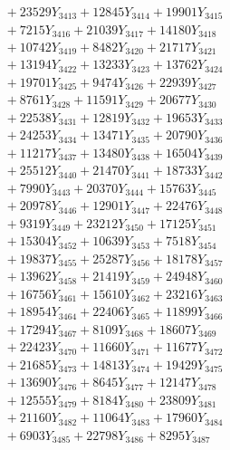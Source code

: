 \documentclass[a4paper,10pt]{article}
\begin{document}
{\begin{align}
&\;  + 23529 Y_{3413} + 12845 Y_{3414} + 19901 Y_{3415} \\[0.3ex]
&\;  + 7215 Y_{3416} + 21039 Y_{3417} + 14180 Y_{3418} \\[0.5ex]\allowbreak
&\;  + 10742 Y_{3419} + 8482 Y_{3420} + 21717 Y_{3421} \\[0.3ex]
&\;  + 13194 Y_{3422} + 13233 Y_{3423} + 13762 Y_{3424} \\[0.3ex]
&\;  + 19701 Y_{3425} + 9474 Y_{3426} + 22939 Y_{3427} \\[0.3ex]
&\;  + 8761 Y_{3428} + 11591 Y_{3429} + 20677 Y_{3430} \\[0.3ex]
&\;  + 22538 Y_{3431} + 12819 Y_{3432} + 19653 Y_{3433} \\[0.3ex]
&\;  + 24253 Y_{3434} + 13471 Y_{3435} + 20790 Y_{3436} \\[0.3ex]
&\;  + 11217 Y_{3437} + 13480 Y_{3438} + 16504 Y_{3439} \\[0.3ex]
&\;  + 25512 Y_{3440} + 21470 Y_{3441} + 18733 Y_{3442} \\[0.3ex]
&\;  + 7990 Y_{3443} + 20370 Y_{3444} + 15763 Y_{3445} \\[0.3ex]
&\;  + 20978 Y_{3446} + 12901 Y_{3447} + 22476 Y_{3448} \\[0.5ex]\allowbreak
&\;  + 9319 Y_{3449} + 23212 Y_{3450} + 17125 Y_{3451} \\[0.3ex]
&\;  + 15304 Y_{3452} + 10639 Y_{3453} + 7518 Y_{3454} \\[0.3ex]
&\;  + 19837 Y_{3455} + 25287 Y_{3456} + 18178 Y_{3457} \\[0.3ex]
&\;  + 13962 Y_{3458} + 21419 Y_{3459} + 24948 Y_{3460} \\[0.3ex]
&\;  + 16756 Y_{3461} + 15610 Y_{3462} + 23216 Y_{3463} \\[0.3ex]
&\;  + 18954 Y_{3464} + 22406 Y_{3465} + 11899 Y_{3466} \\[0.3ex]
&\;  + 17294 Y_{3467} + 8109 Y_{3468} + 18607 Y_{3469} \\[0.3ex]
&\;  + 22423 Y_{3470} + 11660 Y_{3471} + 11677 Y_{3472} \\[0.3ex]
&\;  + 21685 Y_{3473} + 14813 Y_{3474} + 19429 Y_{3475} \\[0.3ex]
&\;  + 13690 Y_{3476} + 8645 Y_{3477} + 12147 Y_{3478} \\[0.5ex]\allowbreak
&\;  + 12555 Y_{3479} + 8184 Y_{3480} + 23809 Y_{3481} \\[0.3ex]
&\;  + 21160 Y_{3482} + 11064 Y_{3483} + 17960 Y_{3484} \\[0.3ex]
&\;  + 6903 Y_{3485} + 22798 Y_{3486} + 8295 Y_{3487} \\[0.3ex]

\end{align}}
\end{document}
